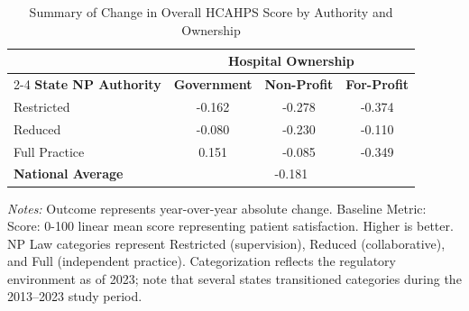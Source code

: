 \begin{table}[htbp]
    \centering
    \caption{Summary of Change in Overall HCAHPS Score by Authority and Ownership}
    \label{tab:d_hcahps_100_score}
    \vspace{0.2cm}
    \begin{tabular}{lccc}
        \toprule
        & \multicolumn{3}{c}{\textbf{Hospital Ownership}} \\
        \cmidrule(lr){2-4}
        \textbf{State NP Authority} & \textbf{Government} & \textbf{Non-Profit} & \textbf{For-Profit} \\
        \midrule
        Restricted & -0.162 & -0.278 & -0.374 \\
        Reduced & -0.080 & -0.230 & -0.110 \\
        Full Practice & 0.151 & -0.085 & -0.349 \\
        \midrule
        \textbf{National Average} & \multicolumn{3}{c}{-0.181} \\
        \bottomrule
    \end{tabular}
    \vspace{0.1cm}
    \begin{minipage}{0.85\textwidth}
        \footnotesize \textit{Notes:} Outcome represents year-over-year absolute change. Baseline Metric: Score: 0-100 linear mean score representing patient satisfaction. Higher is better. NP Law categories represent Restricted (supervision), Reduced (collaborative), and Full (independent practice). Categorization reflects the regulatory environment as of 2023; note that several states transitioned categories during the 2013--2023 study period.
    \end{minipage}
\end{table}